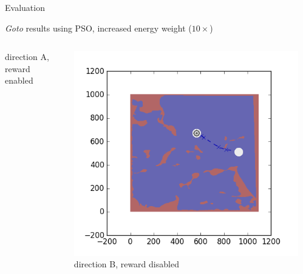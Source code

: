 \documentclass[9pt]{beamer}
\begin{document}
\begin{frame}{Evaluation}
\begin{block}{\textit{Goto} results using PSO, increased energy weight ($10\times$)}
\begin{columns}
\begin{column}{0.25\textwidth}
\begin{center}
                    \newline
                    \tiny{direction A, reward enabled}
                \end{center}
            \end{column}
            \begin{column}{0.25\textwidth}
                \begin{center}
                    \includegraphics[width=\textwidth,trim={2cm 2cm 2cm 2cm},clip]{img/EXP3RG_PathBb_-1_-1_0d001_0.png}
                    \newline
                    \tiny{direction B, reward disabled}
                \end{center}
            \end{column}
            \begin{column}{0.25\textwidth}
                \begin{center}

\end{center}
\end{column}
\end{columns}
\end{block}
\end{frame}
\end{document}
